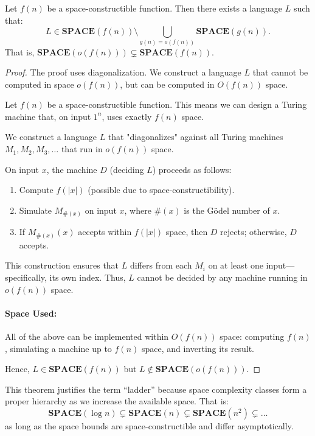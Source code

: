 \begin{theorem}
Let $f(n)$ be a space-constructible function. Then there exists a language $L$ such that:
\[
L \in \mathbf{SPACE}(f(n)) \setminus \bigcup_{g(n) = o(f(n))} \mathbf{SPACE}(g(n)).
\]
That is, $\mathbf{SPACE}(o(f(n))) \subsetneq \mathbf{SPACE}(f(n))$.
\end{theorem}

\begin{proof}
The proof uses diagonalization. We construct a language $L$ that cannot be computed in space $o(f(n))$, but can be computed in $O(f(n))$ space.

Let $f(n)$ be a space-constructible function. This means we can design a Turing machine that, on input $1^n$, uses exactly $f(n)$ space.

We construct a language $L$ that "diagonalizes" against all Turing machines $M_1, M_2, M_3, \dots$ that run in $o(f(n))$ space.

On input $x$, the machine $D$ (deciding $L$) proceeds as follows:
\begin{enumerate}
    \item Compute $f(|x|)$ (possible due to space-constructibility).
    \item Simulate $M_{\#(x)}$ on input $x$, where $\#(x)$ is the Gödel number of $x$.
    \item If $M_{\#(x)}(x)$ accepts within $f(|x|)$ space, then $D$ rejects; otherwise, $D$ accepts.
\end{enumerate}

This construction ensures that $L$ differs from each $M_i$ on at least one input—specifically, its own index. Thus, $L$ cannot be decided by any machine running in $o(f(n))$ space.

\paragraph{Space Used:} All of the above can be implemented within $O(f(n))$ space: computing $f(n)$, simulating a machine up to $f(n)$ space, and inverting its result.

Hence, $L \in \mathbf{SPACE}(f(n))$ but $L \notin \mathbf{SPACE}(o(f(n)))$.

\end{proof}

\begin{remark}
This theorem justifies the term ``ladder'' because space complexity classes form a proper hierarchy as we increase the available space. That is:
\[
\mathbf{SPACE}(\log n) \subsetneq \mathbf{SPACE}(n) \subsetneq \mathbf{SPACE}(n^2) \subsetneq \dots
\]
as long as the space bounds are space-constructible and differ asymptotically.
\end{remark}

